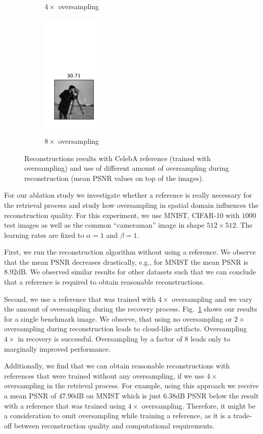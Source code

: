 \begin{figure}
\begin{subfigure}{.24\textwidth}
		\caption{$4\times$ oversampling}
	\end{subfigure}
	\begin{subfigure}{.24\textwidth}
		\centering
		\includegraphics[width=3cm, trim= 10 35 10 120]{data/eight-times-oversampling.pdf}
		\caption{$8\times$ oversampling}
	\end{subfigure}
	\caption{Reconstructions results with CelebA reference (trained with oversampling) and use of different amount of oversampling during reconstruction (mean PSNR values on top of the images).}
	\label{oversampling}
\end{figure}

For our ablation study we investigate whether a reference is really
necessary for the retrieval process and study how oversampling
in spatial domain influences the reconstruction quality. For this
experiment, we use MNIST, CIFAR-10 with $1000$ test images as well as
the common ``cameraman'' image in shape $512 \times 512$. The learning rates are fixed to $\alpha=1$ and $\beta=1$.

First, we run the reconstruction algorithm without using a reference. We observe that the mean PSNR decreases drastically, e.g., for MNIST the mean PSNR is $8.92\text{dB}$. We observed similar results for other datasets such that we can conclude that a reference is required to obtain reasonable reconstructions.

Second, we use a reference that was trained with  $4\times$ oversampling and we vary the amount of oversampling during the recovery process. Fig.~\ref{oversampling} shows our results for a single benchmark image. We observe, that using no oversampling or $2\times$ oversampling during reconstruction leads to cloud-like artifacts. Oversampling $4\times$ in recovery is successful. Oversampling by a factor of $8$ leads only to marginally improved performance.

Additionally, we find that we can obtain reasonable reconstructions with references that were trained without any oversampling, if we use $4\times$  oversampling in the retrieval process. For example, using this approach we receive a mean PSNR of $47.90\text{dB}$ on MNIST which is just $6.38 \text{dB}$ PSNR below the result with a reference that was trained using $4 \times$ oversampling. Therefore, it might be a consideration to omit oversampling while training a reference, as it is a trade-off between reconstruction quality and computational requirements.



